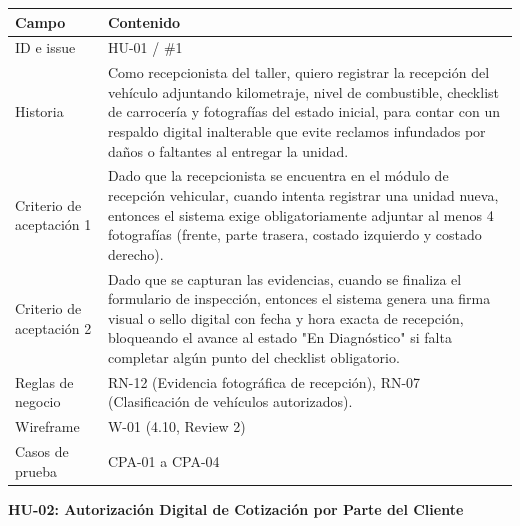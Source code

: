 {\def\LTcaptype{none} %
\begin{longtable}[]{@{}
  >{\raggedright\arraybackslash}p{}
  >{\raggedright\arraybackslash}p{}@{}}
\toprule\noalign{}
\begin{minipage}[b]{\linewidth}\raggedright
\textbf{Campo}
\end{minipage} & \begin{minipage}[b]{\linewidth}\raggedright
\textbf{Contenido}
\end{minipage} \\
\midrule\noalign{}
\endhead
\bottomrule\noalign{}
\endlastfoot
ID e issue & HU-01 / \#1 \\
Historia & Como recepcionista del taller, quiero registrar la recepción
del vehículo adjuntando kilometraje, nivel de combustible, checklist de
carrocería y fotografías del estado inicial, para contar con un respaldo
digital inalterable que evite reclamos infundados por daños o faltantes
al entregar la unidad. \\
Criterio de aceptación 1 & Dado que la recepcionista se encuentra en el
módulo de recepción vehicular, cuando intenta registrar una unidad
nueva, entonces el sistema exige obligatoriamente adjuntar al menos 4
fotografías (frente, parte trasera, costado izquierdo y costado
derecho). \\
Criterio de aceptación 2 & Dado que se capturan las evidencias, cuando
se finaliza el formulario de inspección, entonces el sistema genera una
firma visual o sello digital con fecha y hora exacta de recepción,
bloqueando el avance al estado "En Diagnóstico" si falta completar algún
punto del checklist obligatorio. \\
Reglas de negocio & RN-12 (Evidencia fotográfica de recepción), RN-07
(Clasificación de vehículos autorizados). \\
Wireframe & W-01 (4.10, Review 2) \\
Casos de prueba & CPA-01 a CPA-04 \\
\end{longtable}
}

\textbf{HU-02: Autorización Digital de Cotización por Parte del Cliente}

